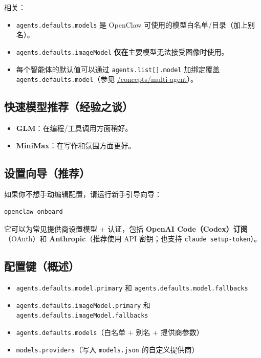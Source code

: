 相关：

\begin{itemize}
  \item \texttt{agents.defaults.models} 是 OpenClaw 可使用的模型白名单/目录（加上别名）。
  \item \texttt{agents.defaults.imageModel} \textbf{仅在}主要模型无法接受图像时使用。
  \item 每个智能体的默认值可以通过 \texttt{agents.list[].model} 加绑定覆盖 \texttt{agents.defaults.model}（参见 \href{/concepts/multi-agent}{/concepts/multi-agent}）。
\end{itemize}


\subsection{快速模型推荐（经验之谈）}


\begin{itemize}
  \item \textbf{GLM}：在编程/工具调用方面稍好。
  \item \textbf{MiniMax}：在写作和氛围方面更好。
\end{itemize}


\subsection{设置向导（推荐）}


如果你不想手动编辑配置，请运行新手引导向导：

\begin{lstlisting}[language=bash]
openclaw onboard
\end{lstlisting}


它可以为常见提供商设置模型 + 认证，包括 \textbf{OpenAI Code（Codex）订阅}（OAuth）和 \textbf{Anthropic}（推荐使用 API 密钥；也支持 \texttt{claude setup-token}）。

\subsection{配置键（概述）}


\begin{itemize}
  \item \texttt{agents.defaults.model.primary} 和 \texttt{agents.defaults.model.fallbacks}
  \item \texttt{agents.defaults.imageModel.primary} 和 \texttt{agents.defaults.imageModel.fallbacks}
  \item \texttt{agents.defaults.models}（白名单 + 别名 + 提供商参数）
  \item \texttt{models.providers}（写入 \texttt{models.json} 的自定义提供商）
\end{itemize}


